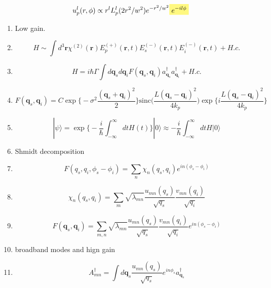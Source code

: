 \documentclass[12pt]{article}
\newcommand{\highlight}[1]{%
  \colorbox{yellow!50}{$\displaystyle#1$}}
\begin{document}
\maketitle

\begin{equation}
u_{p}^{l}(r, \phi) \propto r^{l} L_{p}^{l} (2r^2/w^2) e^{-r^2/w^2} \highlight{e^{-il\phi}}
\end{equation}


\begin{enumerate}
\item Low gain.
\item  $$ H \sim \int d^3\mathbf{r} \chi^{(2)}(\mathbf{r}) E_{p}^{(+)}(\mathbf{r},t) E_{s}^{(-)}(\mathbf{r},t) E_{i}^{(-)}(\mathbf{r},t)   + H.c.$$
\item  $$ H = i \hbar \Gamma \int d\mathbf{q}_{s}d\mathbf{q}_{i}F(\mathbf{q}_{s},\mathbf{q}_{i})a_{\mathbf{q}_{s}}^{\dag}a_{\mathbf{q}_{i}}^{\dag} + H.c.$$
\item  $$F(\mathbf{q}_{s},\mathbf{q}_{i}) = C\exp\big\{-\sigma^2\frac{(\mathbf{q}_{s} + \mathbf{q}_{i})^2}{2}  \big\} \textrm{sinc}\Big(\frac{L(\mathbf{q}_{s} - \mathbf{q}_{i})^2}{4k_{p}}\Big)\exp\big\{i\frac{L(\mathbf{q}_{s} - \mathbf{q}_{i})^2}{4k_{p}}\big\}  $$
\item $$ |\psi\rangle = \exp\big\{-\frac{i}{\hbar}\int_{-\infty}^{\infty} dtH(t)\big\} |0\rangle  \approx  - \frac{i}{\hbar} \int_{-\infty}^{\infty} dtH|0\rangle $$

\item Shmidt decomposition 

\item $$ F(q_{s}, q_{i}, \phi_{s} - \phi_{i}) = \sum_{n} \chi_{n}(q_{s}, q_{i})e^{in(\phi_{s} - \phi_{i})} $$

\item $$ \chi_{n}(q_{s}, q_{i}) = \sum_{m} \sqrt{\lambda_{mn}} \frac{u_{mn}(q_{s})}{\sqrt{q_{s}}} \frac{v_{mn}(q_{i})}{\sqrt{q_{i}}}   $$

\item $$ F(\mathbf{q}_{s}, \mathbf{q}_{i}) = \sum_{m,n} \sqrt{\lambda_{mn}} \frac{u_{mn}(q_{s})}{\sqrt{q_{s}}} \frac{v_{mn}(q_{i})}{\sqrt{q_{i}}} e^{in(\phi_{s} - \phi_{i})}  $$

\item broadband modes and hign gain

\item $$ A_{mn}^{\dag} = \int d\mathbf{q}_{s} \frac{u_{mn}(q_{s})}{\sqrt{q_{s}}} e^{in\phi_{s}} a_{\mathbf{q}_{s}}^{\dag} $$


\end{enumerate}
\end{document}
